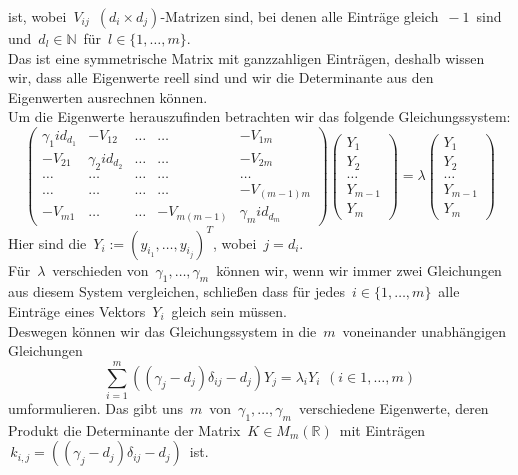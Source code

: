 ist, wobei $\,V_{ij}\,$ $(d_i\times d_j)$-Matrizen sind, bei denen alle Einträge gleich $\,-1\,$ sind und $\,d_l\in\mathbb{N}\,$ für $\,l\in \{1,\ldots,m\}$.\;\\
Das ist eine symmetrische Matrix mit ganzzahligen Einträgen, deshalb wissen wir, dass alle Eigenwerte reell sind und wir die Determinante aus den Eigenwerten ausrechnen können.\\
Um die Eigenwerte herauszufinden betrachten wir das folgende Gleichungssystem:
\begin{equation*}
\begin{pmatrix}
 {\gamma_1}id_{d_1}&-V_{12}&\ldots&\ldots&-V_{1m}\\
 -V_{21}&{\gamma_2}id_{d_2}&\ldots&\ldots&-V_{2m}\\
 \ldots&\ldots&\ldots&\ldots&\ldots\\
  \ldots&\ldots&\ldots&\ldots&-V_{(m-1)m}\\
 -V_{m1}&\ldots&\ldots&-V_{m(m-1)}&{\gamma_m}id_{d_m}
\end{pmatrix}
\begin{pmatrix}
 Y_1\\
 Y_2\\
 \ldots\\
 Y_{m-1}\\
 Y_m
\end{pmatrix}
 =\lambda
 \begin{pmatrix}
 Y_1\\
 Y_2\\
 \ldots\\
 Y_{m-1}\\
 Y_m
\end{pmatrix}
\end{equation*}
Hier sind die $\,Y_i:=(y_{i_1},\ldots,y_{i_j})^T$,\; wobei $\,j=d_i$.\; \\
Für $\,\lambda\,$ verschieden von $\,\gamma_1,\ldots,\gamma_m\,$ können wir, wenn wir immer zwei Gleichungen aus diesem System vergleichen, schließen dass für jedes $\,i \in \{1,\ldots,m\}\,$ alle Einträge eines Vektors $\,Y_i\,$ gleich sein müssen.\\
Deswegen können wir das Gleichungssystem in die $\,m\,$ voneinander unabhängigen Gleichungen 
\begin{equation*}
 \sum_{i=1}^m((\gamma_j-d_j)\delta_{ij}-d_j)Y_j=\lambda_iY_i
  \hspace{5pt}(i\in{1,\ldots,m})
\end{equation*}
umformulieren.
Das gibt uns $\,m\,$  von $\,\gamma_1,\ldots,\gamma_m\,$ verschiedene Eigenwerte, deren Produkt die Determinante der Matrix $\,K \in M_m(\mathbb{R})\,$ mit Einträgen $\,k_{i,j}=((\gamma_j-d_j)\delta_{ij}-d_j)\,$ ist.\\
